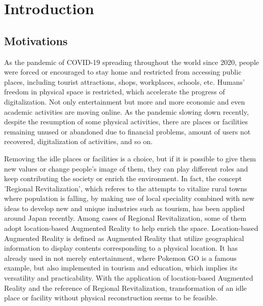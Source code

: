 \chapter{Introduction}

\section{Motivations}

As the pandemic of COVID-19 spreading throughout the world since 2020,
people were forced or encouraged to stay home and restricted from accessing public places,
including tourist attractions, shops, workplaces, schools, etc.
Humans' freedom in physical space is restricted, which accelerate the progress of digitalization.
Not only entertainment but more and more economic and even academic activities are moving online.
As the pandemic slowing down recently, despite the resumption of some physical activities,
there are places or facilities remaining unused or abandoned due to financial problems,
amount of users not recovered, digitalization of activities, and so on.

Removing the idle places or facilities is a choice, but if it is possible to give them new values or change people's image of them,
they can play different roles and keep contributing the society or enrich the environment.
In fact, the concept 'Regional Revitalization', which referes to the attempts to vitalize rural towns where population is falling,
by making use of local speciality combined with new ideas to develop new and unique industries such as tourism, has been applied around Japan recently.
Among cases of Regional Revitalization, some of them adopt location-based Augmented Reality to help enrich the space.
Location-based Augmented Reality is defined as Augmented Reality that utilize geographical information to display contents corresponding to a physical location.
It has already used in not merely entertainment, where Pokemon GO is a famous example,
but also implemented in tourism and education, which implies its versatility and practicability.
With the application of location-based Augmented Reality and the reference of Regional Revitalization,
transformation of an idle place or facility without physical reconstruction seems to be feasible.


